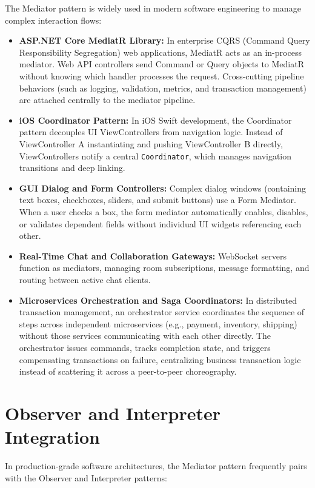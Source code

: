 \documentclass[12pt,a4paper]{article}
\begin{document}
The Mediator pattern is widely used in modern software engineering to manage complex interaction flows:

\begin{itemize}
    \item \textbf{ASP.NET Core MediatR Library:} In enterprise CQRS (Command Query Responsibility Segregation) web applications, MediatR acts as an in-process mediator. Web API controllers send Command or Query objects to MediatR without knowing which handler processes the request. Cross-cutting pipeline behaviors (such as logging, validation, metrics, and transaction management) are attached centrally to the mediator pipeline.
    \item \textbf{iOS Coordinator Pattern:} In iOS Swift development, the Coordinator pattern decouples UI ViewControllers from navigation logic. Instead of ViewController A instantiating and pushing ViewController B directly, ViewControllers notify a central \texttt{Coordinator}, which manages navigation transitions and deep linking.
    \item \textbf{GUI Dialog and Form Controllers:} Complex dialog windows (containing text boxes, checkboxes, sliders, and submit buttons) use a Form Mediator. When a user checks a box, the form mediator automatically enables, disables, or validates dependent fields without individual UI widgets referencing each other.
    \item \textbf{Real-Time Chat and Collaboration Gateways:} WebSocket servers function as mediators, managing room subscriptions, message formatting, and routing between active chat clients.
    \item \textbf{Microservices Orchestration and Saga Coordinators:} In distributed transaction management, an orchestrator service coordinates the sequence of steps across independent microservices (e.g., payment, inventory, shipping) without those services communicating with each other directly. The orchestrator issues commands, tracks completion state, and triggers compensating transactions on failure, centralizing business transaction logic instead of scattering it across a peer-to-peer choreography.
\end{itemize}

\newpage
\section{Observer and Interpreter Integration}

In production-grade software architectures, the Mediator pattern frequently pairs with the Observer and Interpreter patterns:
\end{document}
